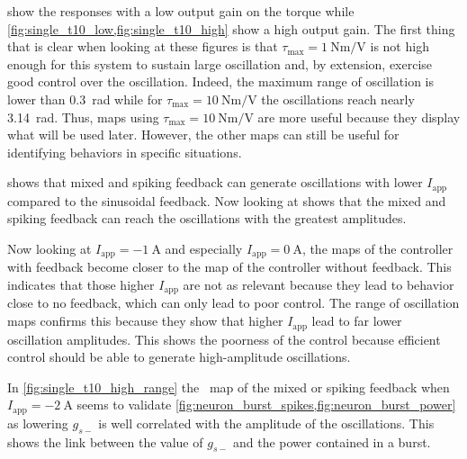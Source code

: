  show the responses with a low output gain on the torque while \cref{fig:single_t10_low,fig:single_t10_high} show a high output gain.
The first thing that is clear when looking at these figures is that $\tau_\text{max} = \qty{1}{\newton\meter\per\volt}$ is not high enough for this system to sustain large oscillation and, by extension, exercise good control over the oscillation.
Indeed, the maximum range of oscillation is lower than \qty{0.3}{\radian} while for $\tau_\text{max} = \qty{10}{\newton\meter\per\volt}$ the oscillations reach nearly \qty{3.14}{\radian}.
Thus, maps using $\tau_\text{max} = \qty{10}{\newton\meter\per\volt}$ are more useful because they display what will be used later.
However, the other maps can still be useful for identifying behaviors in specific situations.


 shows that mixed and spiking feedback can generate oscillations with lower $I_\text{app}$ compared to the sinusoidal feedback.
Now looking at  shows that the mixed and spiking feedback can reach the oscillations with the greatest amplitudes.

Now looking at $I_\text{app} = \qty{-1}{\ampere}$ and especially $I_\text{app} = \qty{0}{\ampere}$, the maps of the controller with feedback become closer to the map of the controller without feedback.
This indicates that those higher $I_\text{app}$ are not as relevant because they lead to behavior close to no feedback, which can only lead to poor control.
The range of oscillation maps confirms this because they show that higher $I_\text{app}$ lead to far lower oscillation amplitudes.
This shows the poorness of the control because efficient control should be able to generate high-amplitude oscillations.

In \cref{fig:single_t10_high_range} the  map of the mixed or spiking feedback when $I_\text{app}=\qty{-2}{\ampere}$ seems to validate \cref{fig:neuron_burst_spikes,fig:neuron_burst_power} as lowering $g_{s-}$ is well correlated with the amplitude of the oscillations. 
This shows the link between the value of $g_{s-}$ and the power contained in a burst.

